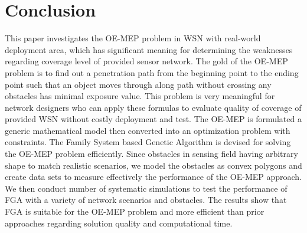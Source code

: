 \documentclass[final]{elsarticle}
\begin{document}
\section{Conclusion}
This paper investigates the OE-MEP problem in WSN with real-world deployment area, which has significant meaning for determining the weaknesses regarding coverage level of provided sensor network. The gold of the OE-MEP problem is to find out a penetration path from the beginning point to the ending point such that an object moves through along path without crossing any obstacles has minimal exposure value. This problem is very meaningful for network designers who can apply these formulas to evaluate quality of coverage of provided WSN without costly deployment and test. The OE-MEP is formulated a generic mathematical model then converted into an optimization problem with constraints. The Family System based Genetic Algorithm is devised for solving the OE-MEP problem efficiently. Since obstacles in sensing field having arbitrary shape to match realistic scenarios, we model the obstacles as convex polygons and create data sets to measure effectively the performance of the OE-MEP approach. We then conduct number of systematic simulations to test the performance of FGA with a variety of network scenarios and obstacles. The results show that FGA is suitable for the OE-MEP problem and more efficient than prior approaches regarding solution quality and computational time. 
\begin{landscape}

\end{landscape}

\end{document}
